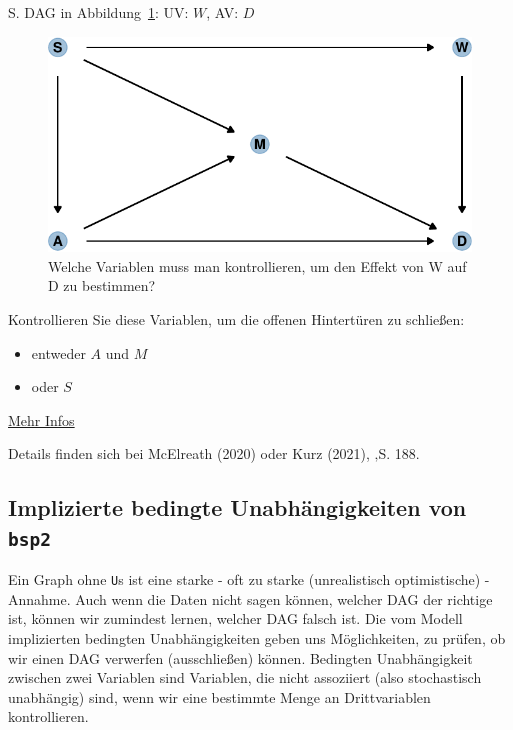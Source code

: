 \documentclass[
  a4paper,
  DIV=11]{scrreprt}
\providecommand{\tightlist}{%
  \setlength{\itemsep}{0pt}\setlength{\parskip}{0pt}}\usepackage{longtable,booktabs,array}
\theoremstyle{definition}
\theoremstyle{remark}
\begin{document}
S. DAG in Abbildung~\ref{fig-dag-bsp2}: UV: \(W\), AV: \(D\)

\begin{figure}

{\centering \includegraphics{./kausal_files/figure-pdf/fig-dag-bsp2-1.pdf}

}

\caption{\label{fig-dag-bsp2}Welche Variablen muss man kontrollieren, um
den Effekt von W auf D zu bestimmen?}

\end{figure}

Kontrollieren Sie diese Variablen, um die offenen Hintertüren zu
schließen:

\begin{itemize}
\tightlist
\item
  entweder \(A\) und \(M\)
\item
  oder \(S\)
\end{itemize}

\href{https://bookdown.org/content/4857/the-haunted-dag-the-causal-terror.html\#backdoor-waffles.}{Mehr
Infos}

Details finden sich bei McElreath (2020) oder Kurz (2021), ‚S. 188.

\hypertarget{implizierte-bedingte-unabhuxe4ngigkeiten-von-bsp2}{%
\subsection{\texorpdfstring{Implizierte bedingte Unabhängigkeiten von
\texttt{bsp2}}{Implizierte bedingte Unabhängigkeiten von bsp2}}\label{implizierte-bedingte-unabhuxe4ngigkeiten-von-bsp2}}

Ein Graph ohne \texttt{U}s ist eine starke - oft zu starke
(unrealistisch optimistische) - Annahme. Auch wenn die Daten nicht sagen
können, welcher DAG der richtige ist, können wir zumindest lernen,
welcher DAG falsch ist. Die vom Modell implizierten bedingten
Unabhängigkeiten geben uns Möglichkeiten, zu prüfen, ob wir einen DAG
verwerfen (ausschließen) können. Bedingten Unabhängigkeit zwischen zwei
Variablen sind Variablen, die nicht assoziiert (also stochastisch
unabhängig) sind, wenn wir eine bestimmte Menge an Drittvariablen
kontrollieren.
\end{document}

